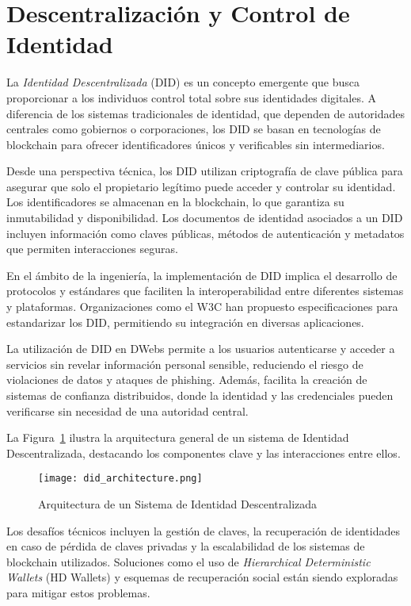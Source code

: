 \section{Descentralización y Control de Identidad}

La \textit{Identidad Descentralizada} (DID) es un concepto emergente que busca proporcionar a los individuos control total sobre sus identidades digitales. A diferencia de los sistemas tradicionales de identidad, que dependen de autoridades centrales como gobiernos o corporaciones, los DID se basan en tecnologías de blockchain para ofrecer identificadores únicos y verificables sin intermediarios.

Desde una perspectiva técnica, los DID utilizan criptografía de clave pública para asegurar que solo el propietario legítimo puede acceder y controlar su identidad. Los identificadores se almacenan en la blockchain, lo que garantiza su inmutabilidad y disponibilidad. Los documentos de identidad asociados a un DID incluyen información como claves públicas, métodos de autenticación y metadatos que permiten interacciones seguras.

En el ámbito de la ingeniería, la implementación de DID implica el desarrollo de protocolos y estándares que faciliten la interoperabilidad entre diferentes sistemas y plataformas. Organizaciones como el W3C han propuesto especificaciones para estandarizar los DID, permitiendo su integración en diversas aplicaciones.

La utilización de DID en DWebs permite a los usuarios autenticarse y acceder a servicios sin revelar información personal sensible, reduciendo el riesgo de violaciones de datos y ataques de phishing. Además, facilita la creación de sistemas de confianza distribuidos, donde la identidad y las credenciales pueden verificarse sin necesidad de una autoridad central.

La Figura~\ref{fig:DID_architecture} ilustra la arquitectura general de un sistema de Identidad Descentralizada, destacando los componentes clave y las interacciones entre ellos.

\begin{figure}[H]
    \centering
    \texttt{[image: did\_architecture.png]}
    \caption{Arquitectura de un Sistema de Identidad Descentralizada}
    \label{fig:DID_architecture}
\end{figure}

Los desafíos técnicos incluyen la gestión de claves, la recuperación de identidades en caso de pérdida de claves privadas y la escalabilidad de los sistemas de blockchain utilizados. Soluciones como el uso de \textit{Hierarchical Deterministic Wallets} (HD Wallets) y esquemas de recuperación social están siendo exploradas para mitigar estos problemas.

